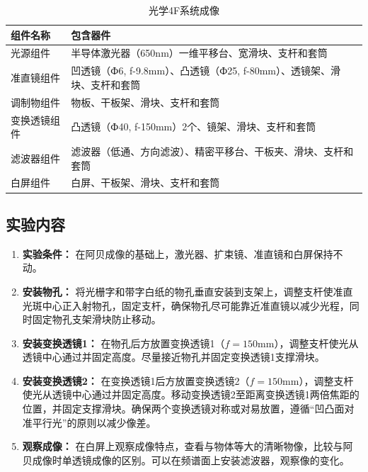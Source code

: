 \documentclass[zihao=5, UTF8]{article}
\theoremstyle{MyLineTheoremStyle} %
\theoremstyle{MyBlockTheoremStyle} %
\theoremstyle{MySubsubsectionStyle} %
\begin{document}
\begin{table}[htbp]
    \centering
    \label{tab:components}
    \begin{tabular}{|p{3cm}|p{12cm}|}
        \hline
        \textbf{组件名称} & \textbf{包含器件} \\ 
        \hline
        光源组件 & 半导体激光器（650nm）一维平移台、宽滑块、支杆和套筒 \\
        \hline
        准直镜组件 & 凹透镜（Ф6, f-9.8mm）、凸透镜（Ф25, f-80mm）、透镜架、滑块、支杆和套筒 \\
        \hline
        调制物组件 & 物板、干板架、滑块、支杆和套筒 \\
        \hline
        变换透镜组件 & 凸透镜（Ф40, f-150mm）2个、镜架、滑块、支杆和套筒 \\
        \hline
        滤波器组件 & 滤波器（低通、方向滤波）、精密平移台、干板夹、滑块、支杆和套筒 \\
        \hline
        白屏组件 & 白屏、干板架、滑块、支杆和套筒 \\
        \hline
    \end{tabular}
    \caption{光学4F系统成像}
\end{table}

\subsection{实验内容}

\begin{enumerate}
    \item \textbf{实验条件：} 在阿贝成像的基础上，激光器、扩束镜、准直镜和白屏保持不动。
    \item \textbf{安装物孔：} 将光栅字和带字白纸的物孔垂直安装到支架上，调整支杆使准直光斑中心正入射物孔，固定支杆，确保物孔尽可能靠近准直镜以减少光程，同时固定物孔支架滑块防止移动。
    \item \textbf{安装变换透镜1：} 在物孔后方放置变换透镜1（$f=150\text{mm}$），调整支杆使光从透镜中心通过并固定高度。尽量接近物孔并固定变换透镜1支撑滑块。
    \item \textbf{安装变换透镜2：} 在变换透镜1后方放置变换透镜2（$f=150\text{mm}$），调整支杆使光从透镜中心通过并固定高度。移动变换透镜2至距离变换透镜1两倍焦距的位置，并固定支撑滑块。确保两个变换透镜对称或对易放置，遵循“凹凸面对准平行光”的原则以减少像差。
    \item \textbf{观察成像：} 在白屏上观察成像特点，查看与物体等大的清晰物像，比较与阿贝成像时单透镜成像的区别。可以在频谱面上安装滤波器，观察像的变化。
\end{enumerate}
\end{document}
